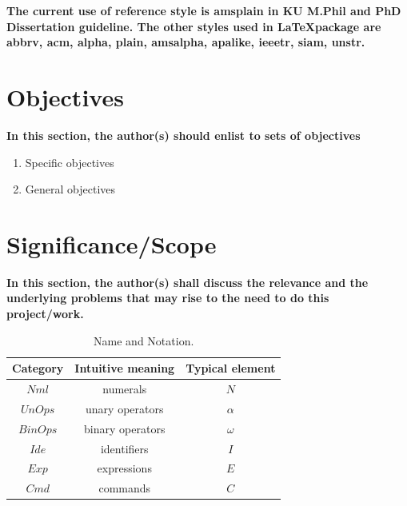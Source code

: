 \noindent
{\color{blue} \bf The current use of reference style is {\color{red} amsplain} in KU M.Phil and PhD Dissertation guideline. The other styles used in \LaTeX package are abbrv, acm, alpha, plain, amsalpha, apalike, ieeetr, siam, unstr.}



\section{{\bf{Objectives}}}
{\bf\color{red}In this section, the author(s) should enlist to sets of objectives
\begin{enumerate}
 \item  Specific objectives 
 \item General objectives 
\end{enumerate}
}

\section{\bf Significance/Scope}
{\bf\color{red}In this section, the author(s) shall discuss the relevance and the underlying problems that may rise to the need to do this project/work.}
\begin{table}[htpb]
\caption{Name and Notation.}
\begin{center}
\begin{tabular}{|c|c|c|}\hline
Category & Intuitive meaning & Typical element \\ \hline
                                                    \hline
$\mathit{Nml}$ & numerals & $N$ \\ \hline
$\mathit{UnOps}$ & unary operators & $\alpha$ \\ \hline
$\mathit{BinOps}$ & binary operators & $\omega$ \\ \hline
$\mathit{Ide}$ & identifiers & $I$ \\ \hline
$\mathit{Exp}$ & expressions & $E$ \\ \hline
$\mathit{Cmd}$ & commands & $C$ \\ \hline
\end{tabular}
\end{center}
\end{table}

